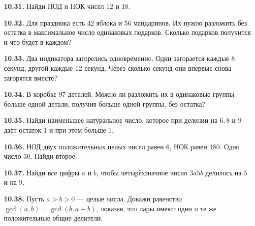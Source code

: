 \noindent\begin{minipage}[t]{\linewidth}\textbf{10.31.} Найди НОД и НОК чисел \(12\) и \(18\).\par\end{minipage}\par
\noindent\begin{minipage}[t]{\linewidth}\textbf{10.32.} Для праздника есть \(42\) яблока и \(56\) мандаринов. Их нужно разложить без остатка в максимальное число одинаковых подарков. Сколько подарков получится и что будет в каждом?\par\end{minipage}\par
\noindent\begin{minipage}[t]{\linewidth}\textbf{10.33.} Два индикатора загорелись одновременно. Один загорается каждые \(8\) секунд, другой каждые \(12\) секунд. Через сколько секунд они впервые снова загорятся вместе?\par\end{minipage}\par
\noindent\begin{minipage}[t]{\linewidth}\textbf{10.34.} В коробке \(97\) деталей. Можно ли разложить их в одинаковые группы больше одной детали, получив больше одной группы, без остатка?\par\end{minipage}\par
\noindent\begin{minipage}[t]{\linewidth}\textbf{10.35.}\starmark{} Найди наименьшее натуральное число, которое при делении на \(6,\allowbreak 8\) и \(9\) даёт остаток \(1\) и при этом больше \(1\).\par\end{minipage}\par
\noindent\begin{minipage}[t]{\linewidth}\textbf{10.36.}\starmark{} НОД двух положительных целых чисел равен \(6\), НОК равен \(180\). Одно число \(30\). Найди второе.\par\end{minipage}\par
\noindent\begin{minipage}[t]{\linewidth}\textbf{10.37.}\starmark{} Найди все цифры \(a\) и \(b\), чтобы четырёхзначное число \(\overline{3a5b}\) делилось на \(5\) и на \(9\).\par\end{minipage}\par
\noindent\begin{minipage}[t]{\linewidth}\textbf{10.38.} Пусть \(a>b>0\) --- целые числа. Докажи равенство \(\gcd(a,b)=\gcd(b,a-b)\), показав, что пары имеют одни и те же положительные общие делители.\par\end{minipage}\par

